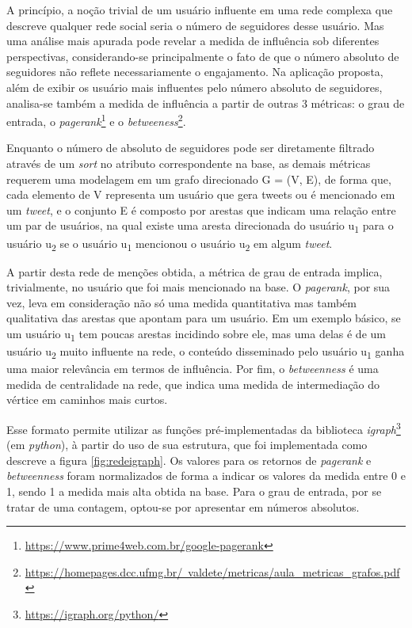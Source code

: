 A princípio, a noção trivial de um usuário influente em uma rede complexa que descreve qualquer rede social seria o número de seguidores desse usuário. Mas uma análise mais apurada pode revelar a medida de influência sob diferentes perspectivas, considerando-se principalmente o fato de que o número absoluto de seguidores não reflete necessariamente o engajamento. Na aplicação proposta, além de exibir os usuário mais influentes pelo número absoluto de seguidores, analisa-se também a medida de influência a partir de outras 3 métricas: o grau de entrada, o \textit{pagerank}\footnote{\href{https://www.prime4web.com.br/google-pagerank}{https://www.prime4web.com.br/google-pagerank}} e o \textit{betweeness}\footnote{\href{https://homepages.dcc.ufmg.br/~valdete/metricas/aula\_metricas\_grafos.pdf}{https://homepages.dcc.ufmg.br/~valdete/metricas/aula\_metricas\_grafos.pdf}}. 
	
Enquanto o número de absoluto de seguidores pode ser diretamente filtrado através de um \textit{sort} no atributo correspondente na base, as demais métricas requerem uma modelagem em um grafo direcionado G = (V, E), de forma que, cada elemento de V representa um usuário que gera tweets ou é mencionado em um \textit{tweet}, e o conjunto E é composto por arestas que indicam uma relação entre um par de usuários, na qual existe uma aresta direcionada do usuário u\textsubscript{1} para o usuário u\textsubscript{2} se o usuário u\textsubscript{1} mencionou o usuário u\textsubscript{2} em algum \textit{tweet}. 

A partir desta rede de menções obtida, a métrica de grau de entrada implica, trivialmente, no usuário que foi mais mencionado na base. O \textit{pagerank}, por sua vez, leva em consideração não só uma medida quantitativa mas também qualitativa das arestas que apontam para um usuário. Em um exemplo básico, se um usuário u\textsubscript{1} tem poucas arestas incidindo sobre ele, mas uma delas é de um usuário u\textsubscript{2} muito influente na rede, o conteúdo disseminado pelo usuário u\textsubscript{1} ganha uma maior relevância em termos de influência. Por fim, o \textit{betweenness} é uma medida de centralidade na rede, que indica uma medida de intermediação do vértice em caminhos mais curtos.

Esse formato permite utilizar as funções pré-implementadas da biblioteca \textit{igraph}\footnote{\href{https://igraph.org/python/}{https://igraph.org/python/}} (em \textit{python}), à partir do uso de sua estrutura, que foi implementada como descreve a figura \ref{fig:redeigraph}. Os valores para os retornos de \textit{pagerank} e \textit{betweenness} foram normalizados de forma a indicar os valores da medida entre 0 e 1, sendo 1 a medida mais alta obtida na base. Para o grau de entrada, por se tratar de uma contagem, optou-se por apresentar em números absolutos.

